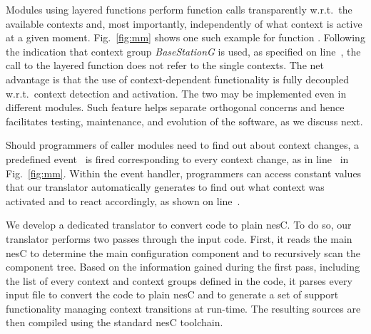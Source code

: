 
Modules using layered functions perform function calls transparently
w.r.t.\ the available contexts and, most importantly, independently of
what context is active at a given moment. Fig.~\ref{fig:mm} shows one
such example for function . Following the indication that
context group \emph{BaseStationG} is used, as specified on
line~, the call to the layered function 
does not refer to the single contexts. The net advantage is that
the use of context-dependent functionality is fully decoupled w.r.t.\
context detection and activation. The two may be implemented even in
different modules. Such feature helps separate
orthogonal concerns and hence facilitates testing, maintenance,
and evolution of the software, as we discuss next.

Should programmers of caller modules need to find out
about context changes, a predefined event~ is
fired corresponding to every context change, as in
line~ in Fig.~\ref{fig:mm}. %
Within the event handler, programmers can access constant values that
our translator automatically generates to find out what context was
activated and to react accordingly, as shown on
line~.



 We develop a dedicated translator to convert
\conesc code to plain nesC. To do so, our translator performs two
passes through the input code. First, it reads the main nesC
 to determine the main configuration component and to
recursively scan the component tree. Based on the information gained
during the first pass, including the list of every context and context
groups defined in the code, it parses every input file to convert the
\conesc code to plain nesC and to generate a set of support
functionality managing context transitions at run-time. The resulting
sources are then compiled using the standard nesC toolchain.

